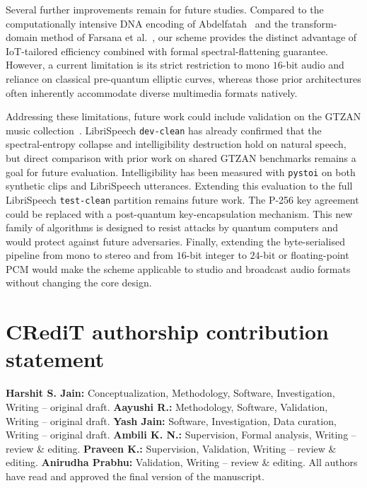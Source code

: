 \documentclass[pdflatex,sn-mathphys-num]{sn-jnl}%
\theoremstyle{thmstyleone}%
\theoremstyle{thmstyletwo}%
\theoremstyle{thmstylethree}%
\begin{document}
Several further improvements remain for future studies. Compared to the computationally intensive DNA encoding of Abdelfatah~\cite{abdelfatah2020} and the transform-domain method of Farsana et al.~\cite{farsana2021}, our scheme provides the distinct advantage of IoT-tailored efficiency combined with formal spectral-flattening guarantee. However, a current limitation is its strict restriction to mono $16$-bit audio and reliance on classical pre-quantum elliptic curves, whereas those prior architectures often inherently accommodate diverse multimedia formats natively. 

Addressing these limitations, future work could include validation on the GTZAN music collection~\cite{tzanetakis2002gtzan}. LibriSpeech \texttt{dev-clean} has already confirmed that the spectral-entropy collapse and intelligibility destruction hold on natural speech, but direct comparison with prior work on shared GTZAN benchmarks remains a goal for future evaluation. Intelligibility has been measured with \texttt{pystoi} on both synthetic clips and LibriSpeech utterances. Extending this evaluation to the full LibriSpeech \texttt{test-clean} partition remains future work. The P-256 key agreement could be replaced with a post-quantum key-encapsulation mechanism. This new family of algorithms is designed to resist attacks by quantum computers and would protect against future adversaries. Finally, extending the byte-serialised pipeline from mono to stereo and from $16$-bit integer to $24$-bit or floating-point PCM would make the scheme applicable to studio and broadcast audio formats without changing the core design.

\backmatter

\section*{CRediT authorship contribution statement}

\textbf{Harshit S. Jain:} Conceptualization, Methodology, Software, Investigation, Writing -- original draft. \textbf{Aayushi R.:} Methodology, Software, Validation, Writing -- original draft. \textbf{Yash Jain:} Software, Investigation, Data curation, Writing -- original draft. \textbf{Ambili K. N.:} Supervision, Formal analysis, Writing -- review \& editing. \textbf{Praveen K.:} Supervision, Validation, Writing -- review \& editing. \textbf{Anirudha Prabhu:} Validation, Writing -- review \& editing. All authors have read and approved the final version of the manuscript.
\end{document}
